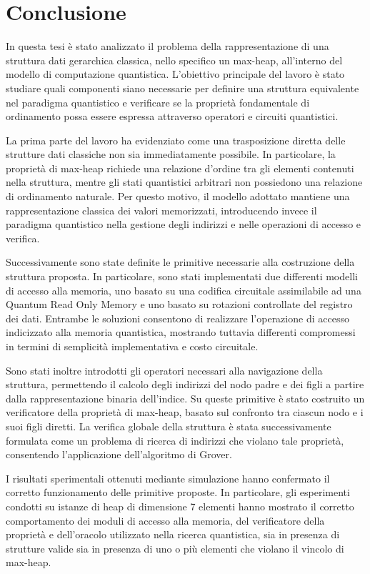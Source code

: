 \chapter*{Conclusione} %

In questa tesi è stato analizzato il problema della rappresentazione di una struttura dati gerarchica classica, nello specifico un max-heap, all'interno del modello di computazione quantistica. L'obiettivo principale del lavoro è stato studiare quali componenti siano necessarie per definire una struttura equivalente nel paradigma quantistico e verificare se la proprietà fondamentale di ordinamento possa essere espressa attraverso operatori e circuiti quantistici.

La prima parte del lavoro ha evidenziato come una trasposizione diretta delle strutture dati classiche non sia immediatamente possibile. In particolare, la proprietà di max-heap richiede una relazione d'ordine tra gli elementi contenuti nella struttura, mentre gli stati quantistici arbitrari non possiedono una relazione di ordinamento naturale. Per questo motivo, il modello adottato mantiene una rappresentazione classica dei valori memorizzati, introducendo invece il paradigma quantistico nella gestione degli indirizzi e nelle operazioni di accesso e verifica.

Successivamente sono state definite le primitive necessarie alla costruzione della struttura proposta. In particolare, sono stati implementati due differenti modelli di accesso alla memoria, uno basato su una codifica circuitale assimilabile ad una Quantum Read Only Memory e uno basato su rotazioni controllate del registro dei dati. Entrambe le soluzioni consentono di realizzare l'operazione di accesso indicizzato alla memoria quantistica, mostrando tuttavia differenti compromessi in termini di semplicità implementativa e costo circuitale.

Sono stati inoltre introdotti gli operatori necessari alla navigazione della struttura, permettendo il calcolo degli indirizzi del nodo padre e dei figli a partire dalla rappresentazione binaria dell'indice. Su queste primitive è stato costruito un verificatore della proprietà di max-heap, basato sul confronto tra ciascun nodo e i suoi figli diretti. La verifica globale della struttura è stata successivamente formulata come un problema di ricerca di indirizzi che violano tale proprietà, consentendo l'applicazione dell'algoritmo di Grover.

I risultati sperimentali ottenuti mediante simulazione hanno confermato il corretto funzionamento delle primitive proposte. In particolare, gli esperimenti condotti su istanze di heap di dimensione 7 elementi hanno mostrato il corretto comportamento dei moduli di accesso alla memoria, del verificatore della proprietà e dell'oracolo utilizzato nella ricerca quantistica, sia in presenza di strutture valide sia in presenza di uno o più elementi che violano il vincolo di max-heap.

